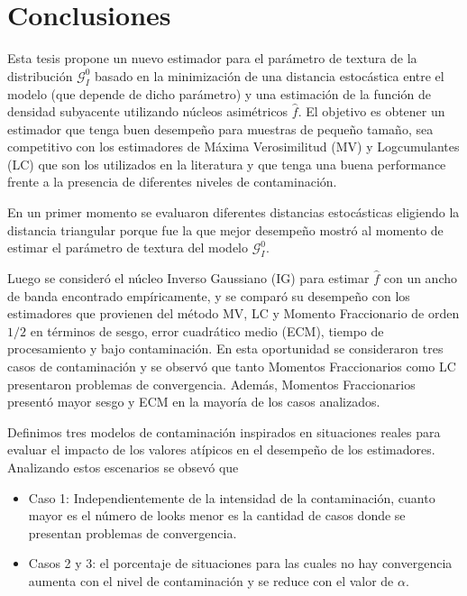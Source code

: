 
\chapter{Conclusiones}
\label{Conclusiones}

Esta tesis propone un nuevo estimador para el parámetro de textura de la distribución $\mathcal{G}_I^0$ basado en la minimización de una distancia estocástica entre el modelo (que depende de dicho parámetro) y una estimación de la función de densidad subyacente utilizando núcleos asimétricos $\widehat{f}$. El objetivo es obtener un estimador que tenga buen desempeño para muestras de pequeño tamaño, sea competitivo con los estimadores de Máxima Verosimilitud (MV) y Logcumulantes (LC) que son los utilizados en la literatura y que tenga una buena performance frente a la presencia de diferentes niveles de contaminación.


En un primer momento se evaluaron diferentes distancias estocásticas eligiendo la distancia triangular porque fue la que mejor desempeño mostró al momento de estimar el parámetro de textura del modelo $\mathcal{G}_I^0$.

Luego se consideró el núcleo Inverso Gaussiano (IG) para estimar $\widehat{f}$ con un ancho de banda encontrado empíricamente, y se comparó su desempeño con los estimadores que provienen del método MV, LC y Momento Fraccionario de orden $1/2$ en términos de sesgo, error cuadrático medio (ECM), tiempo de procesamiento y bajo contaminación. En esta oportunidad se consideraron tres casos de contaminación y se observó que tanto Momentos Fraccionarios como LC presentaron problemas de convergencia. Además, Momentos Fraccionarios presentó mayor sesgo y ECM en la mayoría de los casos analizados.

Definimos tres modelos de contaminación inspirados en situaciones reales para evaluar el impacto de los valores atípicos en el desempeño de los estimadores. Analizando estos escenarios se obsevó que

\begin{itemize}
	\item Caso 1: Independientemente de la intensidad de la contaminación, cuanto mayor es el número de looks menor es la cantidad de casos donde se presentan problemas de convergencia. 
	\item  Casos 2 y 3: el porcentaje de situaciones para las cuales no hay convergencia aumenta con el nivel de contaminación y se reduce con el valor de $\alpha$.
\end{itemize}

